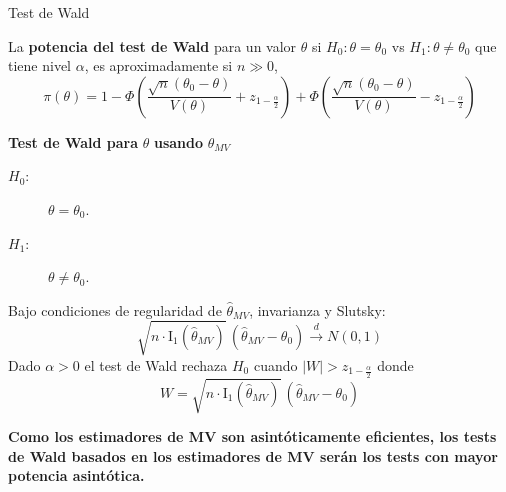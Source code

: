 \documentclass{beamer}
\theoremstyle{definition}
\begin{document}
\begin{frame}{\color{rosee}Test de Wald}\small
  
    La \textbf{potencia del test de Wald }para un valor $\theta$ si $H_0:\theta=\theta_0$ vs $H_1:\theta\neq \theta_0$ que tiene nivel $\alpha$, es aproximadamente si $n\gg 0$,
    $$\pi(\theta)=
1- \Phi\left(\frac{\sqrt{n}(\theta_0 -\theta)}{V(\theta)} + z_{1-\frac{\alpha}{2}} \right) +
      \Phi\left(\frac{\sqrt{n}(\theta_0-\theta)}{V(\theta)}- z_{1-\frac{\alpha}{2}} \right)
    $$

 \textbf{ Test de Wald para} $\theta$ \textbf{usando} $\widehat{\theta}_{MV}$

    \begin{description}
    \item[$H_0$:] $\theta = \theta_0$.
    \item[$H_1$:] $\theta \neq \theta_0$.
    \end{description}
Bajo condiciones de regularidad de $\widehat{\theta}_{MV}$, invarianza y Slutsky:
    \[\sqrt{n \cdot \text{I}_1(\widehat{\theta}_{MV})}\, (\widehat{\theta}_{MV}-\theta_0) \xrightarrow{d}
      N(0,1)\] Dado $\alpha >0$ el test de Wald rechaza
    $H_0$ cuando $|W| > z_{1-\frac{\alpha}{2}}$ donde
    \[W= \sqrt{n \cdot \text{I}_1(\widehat{\theta}_{MV})}\, (\widehat{\theta}_{MV}-\theta_0)\]

 \textbf{Como los estimadores de MV son asintóticamente eficientes, los tests de Wald basados en los estimadores de MV serán los tests con mayor potencia asintótica.}
\end{frame}
\end{document}
